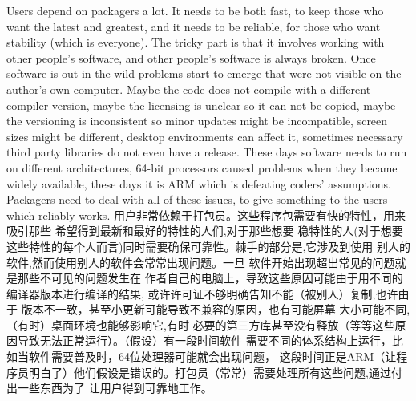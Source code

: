 Users depend on packagers a lot. It needs to be both fast, to keep those who
want the latest and greatest, and it needs to be reliable, for those who want
stability (which is everyone). The tricky part is that it involves working with
other people’s software, and other people’s software is always broken. Once
software is out in the wild problems start to emerge that were not visible on
the author’s own computer. Maybe the code does not compile with a different
compiler version, maybe the licensing is unclear so it can not be copied, maybe
the versioning is inconsistent so minor updates might be incompatible, screen
sizes might be different, desktop environments can affect it, sometimes
necessary third party libraries do not even have a release. These days software
needs to run on different architectures, 64-bit processors caused problems when
they became widely available, these days it is ARM which is defeating coders’
assumptions. Packagers need to deal with all of these issues, to give something
to the users which reliably works.
用户非常依赖于打包员。这些程序包需要有快的特性，用来吸引那些
希望得到最新和最好的特性的人们,对于那些想要
稳特性的人(对于想要这些特性的每个人而言)同时需要确保可靠性。棘手的部分是,它涉及到使用
别人的软件,然而使用别人的软件会常常出现问题。一旦
软件开始出现超出常见的问题就是那些不可见的问题发生在
作者自己的电脑上，导致这些原因可能由于用不同的编译器版本进行编译的结果,
或许许可证不够明确告知不能（被别人）复制,也许由于
版本不一致，甚至小更新可能导致不兼容的原因，也有可能屏幕
大小可能不同,（有时）桌面环境也能够影响它,有时
必要的第三方库甚至没有释放（等等这些原因导致无法正常运行）。（假设）有一段时间软件
需要不同的体系结构上运行，比如当软件需要普及时，64位处理器可能就会出现问题，
这段时间正是ARM（让程序员明白了）他们假设是错误的。打包员（常常）需要处理所有这些问题,通过付出一些东西为了
让用户得到可靠地工作。

